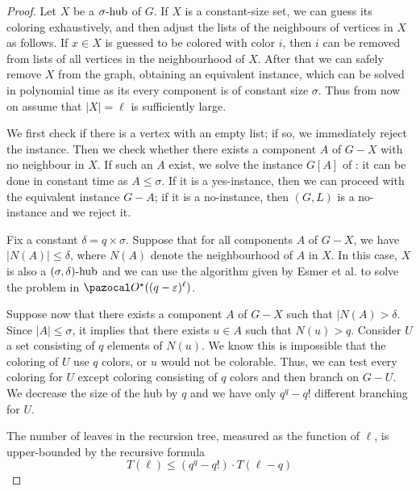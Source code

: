 \begin{proof}

    Let $X$ be a $\sigma\text{-hub}$ of $G$. If $X$ is a constant-size set, we can guess its coloring exhaustively, and then adjust the lists of the neighbours of vertices in $X$ as follows. If $x \in X$ is guessed to be colored with color $i$, then $i$ can be removed from lists of all vertices in the neighbourhood of $X$. After that we can safely remove $X$ from the graph, obtaining an equivalent instance, which can be solved in polynomial time as its every component is of constant size $\sigma$. Thus from now on assume that $|X| = \ell$ is sufficiently large.

    \medskip

    We first check if there is a vertex with an empty list; if so, we immediately reject the instance. Then we check whether there exists a component $A$ of $G - X$ with no neighbour in $X$. If such an $A$ exist, we solve the instance $G[A]$ of : it can be done in constant time as $A \leq \sigma$. If it is a yes-instance, then we can proceed with the equivalent instance $G - A$; if it is a no-instance, then $(G, L)$ is a no-instance and we reject it.

    \medskip


    Fix a constant $\delta = q \times \sigma$. Suppose that for all components $A$ of $G - X$, we have $|N(A)| \leq \delta$, where $N(A)$ denote the neighbourhood of $A$ in $X$. In this case, $X$ is also a $(\sigma, \delta)\text{-hub}$ and we can use the algorithm given by Esmer et al. \cite{esmer2024fundamental} to solve the problem in $\O^\star((q - \varepsilon)^\ell)$.

    \medskip

    Suppose now that there exists a component $A$ of $G - X$ such that $|N(A) > \delta$. Since $|A| \leq \sigma$, it implies that there exists $u \in A$ such that $N(u) > q$. Consider $U$ a set consisting of $q$ elements of $N(u)$. We know this is impossible that the coloring of $U$ use $q$ colors, or $u$ would not be colorable. Thus, we can test every coloring for $U$ except coloring consisting of $q$ colors and then branch on $G - U$. We decrease the size of the hub by $q$ and we have only $q^q - q!$ different branching for $U$.

    The number of leaves in the recursion tree, measured as the function of $\ell$, is upper-bounded by the recursive formula
    $$T(\ell) \leq (q^q - q!) \cdot T(\ell - q)$$

\end{proof}
